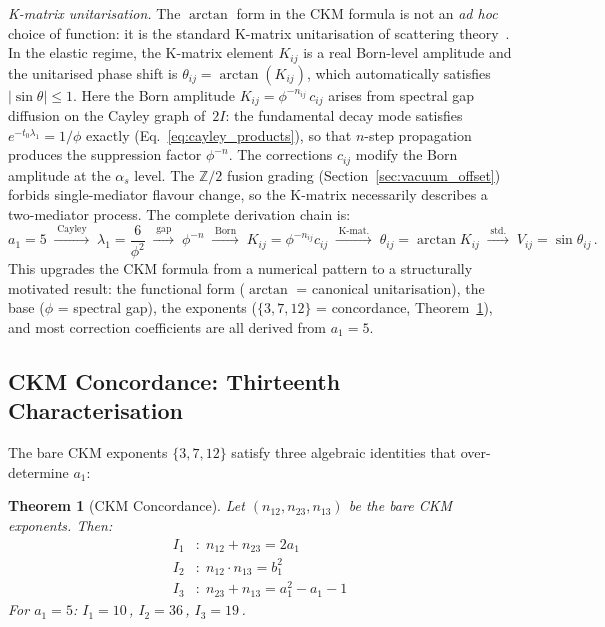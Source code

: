 \documentclass[12pt,a4paper]{article}
\newtheorem{theorem}{Theorem}
\theoremstyle{definition}
\begin{document}
\noindent\textit{K-matrix unitarisation.}  The $\arctan$ form in the CKM formula is not an \emph{ad hoc} choice of function: it is the standard K-matrix unitarisation of scattering theory~\cite{chew1966,dalitz1966}.  In the elastic regime, the K-matrix element $K_{ij}$ is a real Born-level amplitude and the unitarised phase shift is $\theta_{ij} = \arctan(K_{ij})$, which automatically satisfies $|\sin\theta| \leq 1$.  Here the Born amplitude $K_{ij} = \phi^{-n_{ij}}\,c_{ij}$ arises from spectral gap diffusion on the Cayley graph of~$2I$: the fundamental decay mode satisfies $e^{-t_0 \lambda_1} = 1/\phi$ exactly (Eq.~\ref{eq:cayley_products}), so that $n$-step propagation produces the suppression factor $\phi^{-n}$.  The corrections $c_{ij}$ modify the Born amplitude at the $\alpha_s$ level.  The $\mathbb{Z}/2$ fusion grading (Section~\ref{sec:vacuum_offset}) forbids single-mediator flavour change, so the K-matrix necessarily describes a two-mediator process.  The complete derivation chain is:
\begin{equation}
a_1\!=\!5 \;\xrightarrow{\;\text{Cayley}\;}\; \lambda_1\!=\!\frac{6}{\phi^2}
\;\xrightarrow{\;\text{gap}\;}\; \phi^{-n}
\;\xrightarrow{\;\text{Born}\;}\; K_{ij}\!=\!\phi^{-n_{ij}} c_{ij}
\;\xrightarrow{\;\text{K-mat.}\;}\; \theta_{ij}\!=\!\arctan K_{ij}
\;\xrightarrow{\;\text{std.}\;}\; V_{ij}\!=\!\sin\theta_{ij}\,.
\label{eq:kmatrix_chain}
\end{equation}
This upgrades the CKM formula from a numerical pattern to a structurally motivated result: the functional form ($\arctan$ = canonical unitarisation), the base ($\phi$ = spectral gap), the exponents ($\{3,7,12\}$ = concordance, Theorem~\ref{thm:ckm_concordance}), and most correction coefficients are all derived from $a_1 = 5$.

\subsection{CKM Concordance: Thirteenth Characterisation}
\label{sec:ckm_concordance}

The bare CKM exponents $\{3, 7, 12\}$ satisfy three algebraic identities that over-determine $a_1$:

\begin{theorem}[CKM Concordance]
\label{thm:ckm_concordance}
Let $(n_{12}, n_{23}, n_{13})$ be the bare CKM exponents.  Then:
\begin{align}
I_1&\colon\; n_{12} + n_{23} = 2a_1 \label{eq:I1}\\
I_2&\colon\; n_{12} \cdot n_{13} = b_1^2 \label{eq:I2}\\
I_3&\colon\; n_{23} + n_{13} = a_1^2 - a_1 - 1 \label{eq:I3}
\end{align}
For $a_1 = 5$: $I_1 = 10$\,\checkmark, $I_2 = 36$\,\checkmark, $I_3 = 19$\,\checkmark.
\end{theorem}
\end{document}
